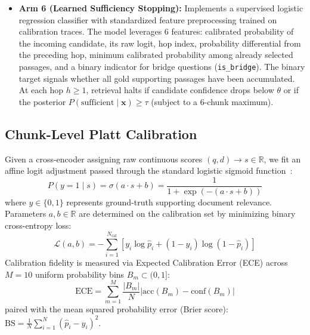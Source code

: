 \documentclass{article}
\begin{document}
\begin{itemize}
    \item \textbf{Arm 6 (Learned Sufficiency Stopping):} Implements a supervised logistic regression classifier with standardized feature preprocessing trained on calibration traces. The model leverages 6 features: calibrated probability of the incoming candidate, its raw logit, hop index, probability differential from the preceding hop, minimum calibrated probability among already selected passages, and a binary indicator for bridge questions (\texttt{is\_bridge}). The binary target signals whether all gold supporting passages have been accumulated. At each hop $h \ge 1$, retrieval halts if candidate confidence drops below $\theta$ or if the posterior $P(\text{sufficient} \mid \mathbf{x}) \ge \tau$ (subject to a 6-chunk maximum).
\end{itemize}

\subsection{Chunk-Level Platt Calibration}
Given a cross-encoder assigning raw continuous scores $(q, d) \to s \in \mathbb{R}$, we fit an affine logit adjustment passed through the standard logistic sigmoid function~\cite{platt1999probabilistic}:
\begin{equation}
    P(y = 1 \mid s) = \sigma(a \cdot s + b) = \frac{1}{1 + \exp(-(a \cdot s + b))}
\end{equation}
where $y \in \{0, 1\}$ represents ground-truth supporting document relevance. Parameters $a, b \in \mathbb{R}$ are determined on the calibration set by minimizing binary cross-entropy loss:
\begin{equation}
    \mathcal{L}(a, b) = -\sum_{i=1}^{N_{\text{cal}}} \left[ y_i \log \hat{p}_i + (1 - y_i) \log(1 - \hat{p}_i) \right]
\end{equation}
Calibration fidelity is measured via Expected Calibration Error (ECE) across $M=10$ uniform probability bins $B_m \subset (0, 1]$:
\begin{equation}
    \text{ECE} = \sum_{m=1}^M \frac{|B_m|}{N} \left| \text{acc}(B_m) - \text{conf}(B_m) \right|
\end{equation}
paired with the mean squared probability error (Brier score): $\text{BS} = \frac{1}{N}\sum_{i=1}^N (\hat{p}_i - y_i)^2$.
\end{document}
